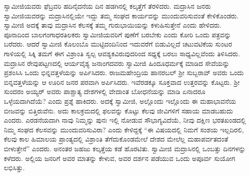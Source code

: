  ಸ್ವಾಮೀಜಿಯವರು ಫೆಬ್ರವರಿ ಹದಿನೈದನೆಯ ದಿನ ಹಡಗಿನಲ್ಲಿ ಕಲ್ಕತ್ತೆಗೆ ತೆರಳಿದರು. ಮದ್ರಾಸಿನ ಜನರು ಸ್ವಾಮೀಜಿಯವರನ್ನು ಮದ್ರಾಸಿನಲ್ಲಿಯೇ ಇದ್ದು ತಮ್ಮ ಸಂಘದ ಕಾರ್ಯವನ್ನು ಮುಂದುವರಿಸುವಂತೆ ಕೇಳಿಕೊಂಡರು. ಸ್ವಾಮೀಜಿ ಅದಕ್ಕೆ ತಾವು ಮದ್ರಾಸಿನ ಕೆಲಸಕ್ಕೆ ತಮ್ಮ ಗುರುಭಾಯಿಯನ್ನು ಕಳುಹಿಸುತ್ತೇನೆ ಎಂದು ಹೇಳಿದರು. ಪೂನಾದಿಂದ ಬಾಲಗಂಗಾಧರತಿಲಕರು ಸ್ವಾಮೀಜಿಯವರಿಗೆ ಪುಣೆಗೆ ಬರಬೇಕು ಎಂದು ಕೋರಿ ಒಂದು ಪತ್ರವನ್ನು ಬರೆದರು. ಆದರೆ ಸ್ವಾಮೀಜಿ ಕೊಲಂಬೊ ಮುಟ್ಟಿದಂದಿನಿಂದ ಇದುವರೆಗೆ ಬಿಡುವಿಲ್ಲದೆ ಚಟುವಟಿಕೆಯ ಸುಂಟರ ಗಾಳಿಯಲ್ಲಿ ಸಿಕ್ಕಿ ತಮಗೆ ಈಗ ವಿಶ್ರಾಂತಿ ಸ್ವಲ್ಪ ಆವಶ್ಯಕವಿರುವುದರಿಂದ ಸಧ್ಯಕ್ಕೆ ಬರಲು ಸಾಧ್ಯವಿಲ್ಲವೆಂದು ತಿಳಿಸಿದರು. ಮದ್ರಾಸಿನ ರೇವುಪಟ್ಟಣದಲ್ಲಿ ಆರ್ಯವೈಶ್ಯ ಜನಾಂಗದವರು ಸ್ವಾಮೀಜಿ ಹಿಂದೂಧರ್ಮಕ್ಕೆ ಮಾಡಿದ ಸೇವೆಯನ್ನು ಪ್ರಶಂಸಿಸಿ ಒಂದು ಭಿನ್ನವತ್ತಳೆಯನ್ನು ಅರ್ಪಿಸಿದರು. ರಾಜಮಹೇಂದ್ರಿಯ ಹಾನರಬಲ್ ಶ‍್ರೀ ಸುಬ್ಬರಾವ್ ಅವರು ಒಂದು ಬಿನ್ನವತ್ತಳೆಯನ್ನು ಆ ಊರಿನ ಜನರ ಪರವಾಗಿ ಅರ್ಪಿಸಿದರು. ಇವೆರಡಕ್ಕೂ ಸೂಕ್ತವಾದ ಉತ್ತರವನ್ನು ಕೊಟ್ಟರು. ಶ‍್ರೀ ಸುಂದರಂ ಅಯ್ಯರ್ ಅವರು ಪಾಶ್ಚಾತ್ಯ ದೇಶಗಳಲ್ಲಿ ವೇದಾಂತ ಬೋಧನೆಯನ್ನು ಮಾಡಿ ಏನಾದರೂ ಒಳ್ಳೆಯದಾಗಿದೆಯೆ? ಎಂದು ಪ್ರಶ್ನೆ ಹಾಕಿದರು. ಅದಕ್ಕೆ ಸ್ವಾಮೀಜಿ, ಅಲ್ಲೊಂದು ಇಲ್ಲೊಂದು ಈ ಮಹಾಭಾವನೆಯ ಬೀಜವನ್ನು ಬಿತ್ತಿರುವೆನು. ಅದು ಕಾಲಕ್ರಮದಲ್ಲಿ ಫಲವನ್ನು ಕೊಟ್ಟು ಕೆಲವು ಜೀವಿಗಳಿಗೆ ಸಹಾಯ ಮಾಡಬಹುದು ಎಂದರು. ಎರಡನೆಯದಾಗಿ ನಾವು ನಿಮ್ಮನ್ನು ಪುನಃ ಇಲ್ಲಿ ನೋಡುವ ಸೌಭಾಗ್ಯವಿದೆಯೆ, ನೀವು ದಕ್ಷಿಣ ಭರತಖಂಡದಲ್ಲಿ ನಿಮ್ಮ ಸಂಘದ ಕೆಲಸವನ್ನು ಮುಂದುವರಿಸುವಿರಾ? ಎಂದು ಕೇಳಿದ್ದಕ್ಕೆ “ಈ ವಿಷಯದಲ್ಲಿ ನಿಮಗೆ ಸಂಶಯ ಇಲ್ಲದಿರಲಿ, ಕೆಲವು ಕಾಲ ಹಿಮಾಲಯ ಪ್ರಾಂತ್ಯದಲ್ಲಿ ವಿಶ್ರಾಂತಿ ತೆಗೆದುಕೊಂಡಮೇಲೆ ದೇಶದ ಮೇಲೆಲ್ಲ ಮಹಾಪರ್ವತದಂತೆ ಬೀಳುತ್ತೇನೆ” ಎಂದರು. ಅನಂತರ ಜಹಜು ಕಲ್ಕತ್ತೆಯ ಕಡೆ ಹೊರಟಿತು. ಸ್ವಾಮೀಜಿ ಮದ್ರಾಸಿನಲ್ಲಿ ಒಂಬತ್ತು ದಿನಗಳನ್ನು ಕಳೆದರು. ಅಲ್ಲಿಯ ಜನರಿಗೆ ಅವರ ಮಾತನ್ನು ಕೇಳುವ, ಅವರ ದರ್ಶನ ಪಡೆಯುವ ಒಂದು ಅಪೂರ್ವ ಸುಯೋಗ ಲಭಿಸಿತ್ತು. 

